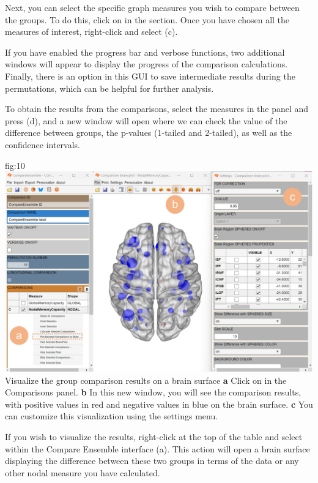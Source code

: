 \documentclass[justified]{tufte-handout}
\begin{document}
Next, you can select the specific graph measures you wish to compare between the groups. To do this, click on  in the  section. Once you have chosen all the measures of interest, right-click and select  (c).

If you have enabled the progress bar and verbose functions, two additional windows will appear to display the progress of the comparison calculations. Finally, there is an option in this GUI to save intermediate results during the permutations, which can be helpful for further analysis.

To obtain the results from the comparisons, select the measures in the  panel and press  ({d}), and a new window will open where we can check the value of the difference between groups, the p-values (1-tailed and 2-tailed), as well as the confidence intervals.

{fig:10}
{
	\includegraphics{fig10.jpg}
}
{Visualize the group comparison results on a brain surface}
{
	{\bf a} Click on  in the Comparisons panel. 
	{\bf b} In this new window, you will see the comparison results, with positive values in red and negative values in blue on the brain surface.
	{\bf c} You can customize this visualization using the settings menu.
}


If you wish to visualize the results, right-click at the top of the table and select  within the Compare Ensemble interface (a). This action will open a brain surface displaying the difference between these two groups in terms of the  data or any other nodal measure you have calculated.
\end{document}
